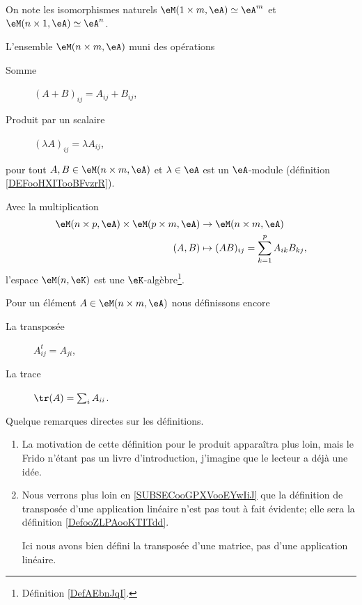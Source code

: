 \begin{normaltext}
    On note les isomorphismes naturels \( \eM(1\times m,\eA) \simeq \eA^m\) et \( \eM(n\times 1,\eA) \simeq \eA^n\).
\end{normaltext}

\begin{lemmaDef}
    L'ensemble \( \eM(n\times m, \eA)\) muni des opérations
    \begin{description}
        \item[Somme] \( (A+B)_{ij}=A_{ij}+B_{ij}\),
        \item[Produit par un scalaire] \( (\lambda A)_{ij}=\lambda A_{ij}\),
    \end{description}
    pour tout \( A,B\in \eM(n\times m,\eA ) \) et \( \lambda\in \eA \) est un \( \eA\)-module (définition \ref{DEFooHXITooBFvzrR}).
\end{lemmaDef}

\begin{lemmaDef}
    Avec la multiplication
    \begin{equation}
        \begin{aligned}
             \eM(n\times p,\eA)\times \eM(p\times m,\eA)&\to \eM(n\times m,\eA) \\
             (A,B)&\mapsto (AB)_{ij}=\sum_{k=1}^pA_{ik}B_{kj},
        \end{aligned}
    \end{equation}
    l'espace \( \eM(n,\eK)\) est une \( \eK\)-algèbre\footnote{Définition \ref{DefAEbnJqI}.}.
\end{lemmaDef}

\begin{definition}
    Pour un élément \( A\in \eM(n\times m, \eA)\) nous définissons encore
    \begin{description}
        \item[La transposée] \( A^t_{ij}=A_{ji}\),
        \item[La trace] \( \tr(A)=\sum_iA_{ii}\).
    \end{description}
\end{definition}


\begin{remark}
    Quelque remarques directes sur les définitions.
    \begin{enumerate}
        \item
            La motivation de cette définition pour le produit apparaîtra plus loin, mais le Frido n'étant pas un livre d'introduction, j'imagine que le lecteur a déjà une idée.
        \item
            Nous verrons plus loin en \ref{SUBSECooGPXVooEYwIiJ} que la définition de transposée d'une application linéaire n'est pas tout à fait évidente; elle sera la définition \ref{DefooZLPAooKTITdd}.

            Ici nous avons bien défini la transposée d'une matrice, pas d'une application linéaire.
    \end{enumerate}
\end{remark}

